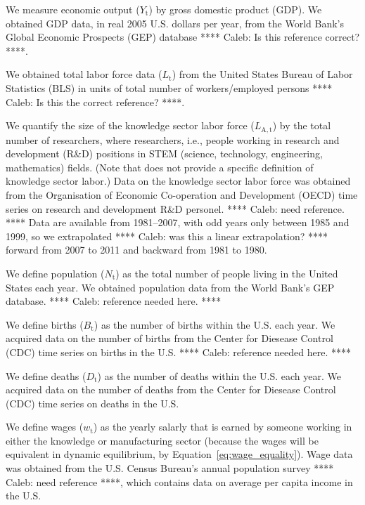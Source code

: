 \documentclass[letterpaper,12pt]{article}
\begin{document}
We measure economic output ($Y_\mathrm{t}$) by gross domestic product (GDP). We obtained GDP data, in real 2005 U.S. dollars per year, from the World Bank's Global Economic Prospects (GEP) database \citep{WorldBankGEP:2013a} **** Caleb: Is this reference correct? ****.

We obtained total labor force data ($L_\mathrm{t}$) from the United States Bureau of Labor Statistics (BLS) in units of total number of workers/employed persons \citep{BLS:2013a} **** Caleb: Is this the correct reference? ****. 

We quantify the size of the knowledge sector labor force ($L_\mathrm{A,t}$) by the total number of researchers, where researchers, i.e., people working in research and development (R\&D) positions in STEM (science, technology, engineering, mathematics) fields. (Note that \citet{Jones:2001wn} does not provide a specific definition of knowledge sector labor.) Data on the knowledge sector labor force was obtained from the Organisation of Economic Co-operation and Development (OECD) time series on research and development R\&D personel. **** Caleb: need reference. **** Data are available from 1981--2007, with odd years only between 1985 and 1999, so we extrapolated **** Caleb: was this a linear extrapolation? **** forward from 2007 to 2011 and backward from 1981 to 1980.

We define population ($N_\mathrm{t}$) as the total number of people living in the United States each year. We obtained population data from the World Bank's GEP database. **** Caleb: reference needed here. ****

We define births ($B_\mathrm{t}$) as the number of births within the U.S. each year. We acquired data on the number of births from the Center for Diesease Control (CDC) time series on births in the U.S. **** Caleb: reference needed here. **** 

We define deaths ($D_\mathrm{t}$) as the number of deaths within the U.S. each year. We acquired data on the number of deaths from the Center for Diesease Control (CDC) time series on deaths in the U.S.

We define wages ($w_\mathrm{t}$) as the yearly salarly that is earned by someone working in either the knowledge or manufacturing sector (because the wages will be equivalent in dynamic equilibrium, by Equation~\ref{eq:wage_equality}). Wage data was obtained from the U.S. Census Bureau's annual population survey **** Caleb: need reference ****, which contains data on average per capita income in the U.S.
\end{document}
